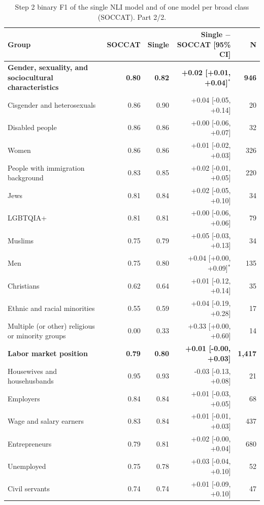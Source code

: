 \begin{table}[htbp]
\centering
\scriptsize
\begin{threeparttable}
\caption{Step 2 binary F1 of the single NLI model and of one model per broad class (SOCCAT). Part 2/2.}
\label{tab:single-nli-part2}
\begin{tabular}{l rr r r}
\toprule
Group & SOCCAT & Single & Single $-$ SOCCAT [95\% CI] & N \\
\midrule
\textbf{Gender, sexuality, and sociocultural characteristics} & \textbf{0.80} & \textbf{0.82} & \textbf{+0.02 [+0.01, +0.04]$^{*}$} & \textbf{946} \\
\quad Cisgender and heterosexuals & 0.86 & 0.90 & +0.04 [-0.05, +0.14] & 20 \\
\quad Disabled people & 0.86 & 0.86 & +0.00 [-0.06, +0.07] & 32 \\
\quad Women & 0.86 & 0.86 & +0.01 [-0.02, +0.03] & 326 \\
\quad People with immigration background & 0.83 & 0.85 & +0.02 [-0.01, +0.05] & 220 \\
\quad Jews & 0.81 & 0.84 & +0.02 [-0.05, +0.10] & 34 \\
\quad LGBTQIA+ & 0.81 & 0.81 & +0.00 [-0.06, +0.06] & 79 \\
\quad Muslims & 0.75 & 0.79 & +0.05 [-0.03, +0.13] & 34 \\
\quad Men & 0.75 & 0.80 & +0.04 [+0.00, +0.09]$^{*}$ & 135 \\
\quad Christians & 0.62 & 0.64 & +0.01 [-0.12, +0.14] & 35 \\
\quad Ethnic and racial minorities & 0.55 & 0.59 & +0.04 [-0.19, +0.28] & 17 \\
\quad Multiple (or other) religious or minority groups & 0.00 & 0.33 & +0.33 [+0.00, +0.60] & 14 \\
\addlinespace
\textbf{Labor market position} & \textbf{0.79} & \textbf{0.80} & \textbf{+0.01 [-0.00, +0.03]} & \textbf{1,417} \\
\quad Housewives and househusbands & 0.95 & 0.93 & -0.03 [-0.13, +0.08] & 21 \\
\quad Employers & 0.84 & 0.84 & +0.01 [-0.03, +0.05] & 68 \\
\quad Wage and salary earners & 0.83 & 0.84 & +0.01 [-0.01, +0.03] & 437 \\
\quad Entrepreneurs & 0.79 & 0.81 & +0.02 [-0.00, +0.04] & 680 \\
\quad Unemployed & 0.75 & 0.78 & +0.03 [-0.04, +0.10] & 52 \\
\quad Civil servants & 0.74 & 0.74 & +0.01 [-0.09, +0.10] & 47 \\

\end{tabular}
\end{threeparttable}
\end{table}
